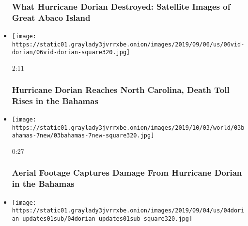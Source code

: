 \begin{itemize}
{  \subsubsection{What Hurricane Dorian Destroyed: Satellite Images of
  Great Abaco
  Island}\label{what-hurricane-dorian-destroyed-satellite-images-of-great-abaco-island}}
\item
  \href{https://www.nytimes3xbfgragh.onion/video/us/100000006699386/hurricane-dorian-carolinas.html?action=click\&module=video-series-bar\&region=header\&pgtype=Article\&playlistId=video/extreme-weather}{}

  \texttt{[image: https://static01.graylady3jvrrxbe.onion/images/2019/09/06/us/06vid-dorian/06vid-dorian-square320.jpg]}

  2:11

  \hypertarget{hurricane-dorian-reaches-north-carolina-death-toll-rises-in-the-bahamas}{%
  \subsubsection{Hurricane Dorian Reaches North Carolina, Death Toll
  Rises in the
  Bahamas}\label{hurricane-dorian-reaches-north-carolina-death-toll-rises-in-the-bahamas}}
\item
  \href{https://www.nytimes3xbfgragh.onion/video/us/100000006695978/hurricane-dorian-bahamas-footage-destruction.html?action=click\&module=video-series-bar\&region=header\&pgtype=Article\&playlistId=video/extreme-weather}{}

  \texttt{[image: https://static01.graylady3jvrrxbe.onion/images/2019/10/03/world/03bahamas-7new/03bahamas-7new-square320.jpg]}

  0:27

  \hypertarget{aerial-footage-captures-damage-from-hurricane-dorian-in-the-bahamas}{%
  \subsubsection{Aerial Footage Captures Damage From Hurricane Dorian in
  the
  Bahamas}\label{aerial-footage-captures-damage-from-hurricane-dorian-in-the-bahamas}}
\item
  \href{https://www.nytimes3xbfgragh.onion/video/us/100000006694578/hurricane-dorian-bahamas.html?action=click\&module=video-series-bar\&region=header\&pgtype=Article\&playlistId=video/extreme-weather}{}

  \texttt{[image: https://static01.graylady3jvrrxbe.onion/images/2019/09/04/us/04dorian-updates01sub/04dorian-updates01sub-square320.jpg]}


\end{itemize}

